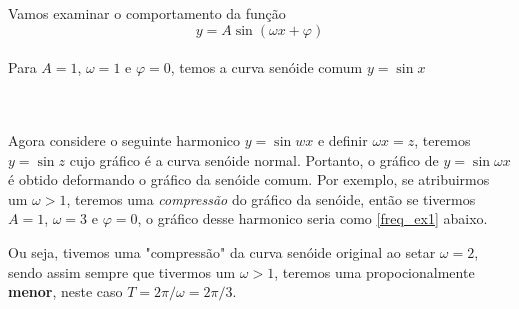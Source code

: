 \documentclass{article}
\newcommand{\senoide}{\mbox{$y = A\sin{(\omega x + \varphi)}$}}
\begin{document}
Vamos examinar o comportamento da função 
\begin{equation}
\label{harm1}
    \senoide
\end{equation}
\\
Para $A=1$, $\omega = 1$ e $\varphi = 0$, temos a curva senóide comum $y = \sin{x}$\\
\\
\\
Agora considere o seguinte harmonico $y = \sin{wx}$ e definir $\omega x = z$, teremos
$y = \sin{z}$ cujo gráfico é a curva senóide normal. Portanto, o gráfico de 
$y = \sin{\omega x}$ é obtido deformando o gráfico da senóide comum. Por exemplo,
se atribuirmos um $\omega > 1$, teremos uma \textit{compressão} do gráfico da
senóide, então se tivermos $A = 1$, $\omega = 3$ e $\varphi = 0$, o gráfico 
desse harmonico seria como \ref{freq_ex1} abaixo.

Ou seja, tivemos uma "compressão" da curva senóide original ao setar $\omega = 2$,
sendo assim sempre que tivermos um $\omega > 1$, teremos uma propocionalmente
\textbf{menor}, neste caso $T = 2\pi / \omega = 2\pi / 3$.
\end{document}
